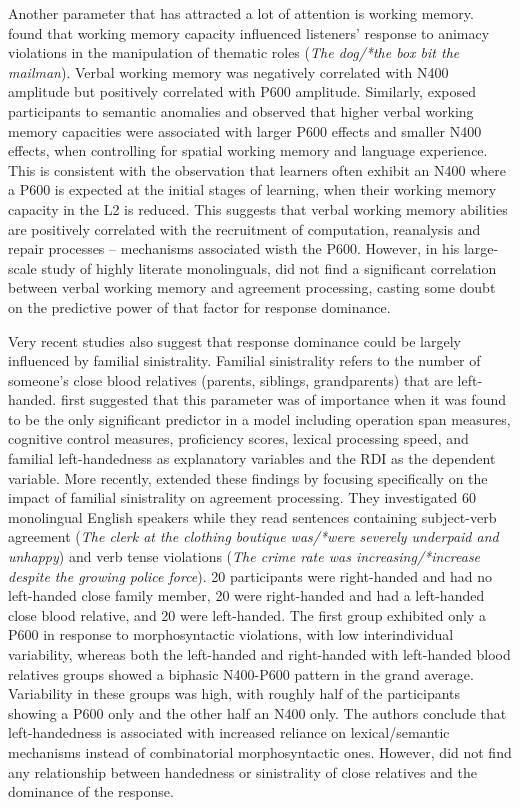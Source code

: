 \documentclass[output=paper,colorlinks,citecolor=brown,modfonts,nonflat]{../langscibook}
\begin{document}
Another parameter that has attracted a lot of attention is working memory. \citet{NakanoEtAl2010} found that working memory capacity influenced listeners’ response to animacy violations in the manipulation of thematic roles (\textit{The dog/*the box bit the mailman}). Verbal working memory was negatively correlated with N400 amplitude but positively correlated with P600 amplitude. Similarly, \citet{KimEtAl2018} exposed participants to semantic anomalies and observed that higher verbal working memory capacities were associated with larger P600 effects and smaller N400 effects, when controlling for spatial working memory and language experience. This is consistent with the observation that learners often exhibit an N400 where a P600 is expected at the initial stages of learning, when their working memory capacity in the L2 is reduced. This suggests that verbal working memory abilities are positively correlated with the recruitment of computation, reanalysis and repair processes – mechanisms associated wisth the P600. However, in his large-scale study of highly literate monolinguals, \citet{Tanner2019} did not find a significant correlation between verbal working memory and agreement processing, casting some doubt on the predictive power of that factor for response dominance.

Very recent studies also suggest that response dominance could be largely influenced by familial sinistrality. Familial sinistrality refers to the number of someone’s close blood relatives (parents, siblings, grandparents) that are left-handed. \citet{TannerHell2014} first suggested that this parameter was of importance when it was found to be the only significant predictor in a model including operation span measures, cognitive control measures, proficiency scores, lexical processing speed, and familial left-handedness as explanatory variables and the RDI as the dependent variable. More recently, \citet{GreyEtAl2017} extended these findings by focusing specifically on the impact of familial sinistrality on agreement processing. They investigated 60 monolingual English speakers while they read sentences containing subject-verb agreement (\textit{The clerk at the clothing boutique was/*were severely underpaid and unhappy}) and verb tense violations (\textit{The crime rate was increasing/*increase despite the growing police force}). 20 participants were right-handed and had no left-handed close family member, 20 were right-handed and had a left-handed close blood relative, and 20 were left-handed. The first group exhibited only a P600 in response to morphosyntactic violations, with low interindividual variability, whereas both the left-handed and right-handed with left-handed blood relatives groups showed a biphasic N400-P600 pattern in the grand average. Variability in these groups was high, with roughly half of the participants showing a P600 only and the other half an N400 only. The authors conclude that left-handedness is associated with increased reliance on lexical/semantic mechanisms instead of combinatorial morphosyntactic ones. However, \citet{Wampler2017} did not find any relationship between handedness or sinistrality of close relatives and the dominance of the response.
\end{document}
